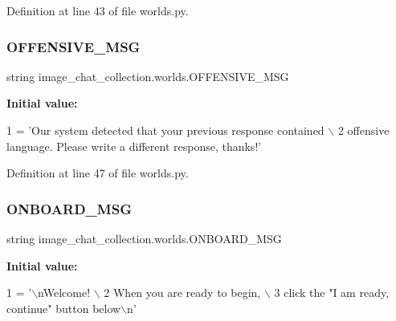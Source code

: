 Definition at line 43 of file worlds.\+py.

\mbox{\label{namespaceimage__chat__collection_1_1worlds_aaec0080d408cae0612fa90d6210b8260}} 
\subsubsection{\texorpdfstring{O\+F\+F\+E\+N\+S\+I\+V\+E\+\_\+\+M\+SG}{OFFENSIVE\_MSG}}
{\footnotesize\ttfamily string image\+\_\+chat\+\_\+collection.\+worlds.\+O\+F\+F\+E\+N\+S\+I\+V\+E\+\_\+\+M\+SG}

{\bfseries Initial value\+:}
\begin{DoxyCode}
1 =  \textcolor{stringliteral}{'Our system detected that your previous response contained \(\backslash\)}
2 \textcolor{stringliteral}{        offensive language. Please write a different response, thanks!'}
\end{DoxyCode}


Definition at line 47 of file worlds.\+py.

\mbox{\label{namespaceimage__chat__collection_1_1worlds_afb9a10429b78311675aa02a06385c178}} 
\subsubsection{\texorpdfstring{O\+N\+B\+O\+A\+R\+D\+\_\+\+M\+SG}{ONBOARD\_MSG}}
{\footnotesize\ttfamily string image\+\_\+chat\+\_\+collection.\+worlds.\+O\+N\+B\+O\+A\+R\+D\+\_\+\+M\+SG}

{\bfseries Initial value\+:}
\begin{DoxyCode}
1 =  \textcolor{stringliteral}{'\(\backslash\)nWelcome! \(\backslash\)}
2 \textcolor{stringliteral}{        When you are ready to begin, \(\backslash\)}
3 \textcolor{stringliteral}{        click the "I am ready, continue" button below\(\backslash\)n'}
\end{DoxyCode}


